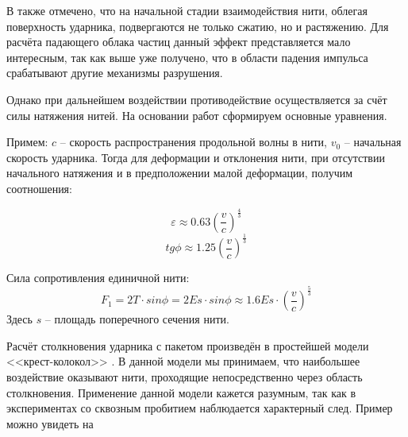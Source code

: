 В\cite{kobylkin2014} также отмечено, что на начальной стадии взаимодействия нити, облегая поверхность ударника, подвергаются
не только сжатию, но и растяжению.
Для расчёта падающего облака частиц данный эффект представляется мало интересным, так как выше уже получено, что в области
падения импульса срабатывают другие механизмы разрушения.

Однако при дальнейшем воздействии противодействие осуществляется за счёт силы натяжения нитей.
На основании работ\cite{rakhmatulin} сформируем основные уравнения.

Примем: $c$ -- скорость распространения продольной волны в нити, $v_0$ -- начальная скорость ударника.
Тогда для деформации и отклонения нити, при отсутствии начального натяжения и в предположении малой деформации,
получим соотношения:

\begin{equation}
    \varepsilon \approx 0.63 \left( \dfrac{v}{c} \right)^{\frac{4}{3}}
\end{equation}
\begin{equation}
    tg \phi \approx 1.25 \left( \dfrac{v}{c} \right)^{\frac{1}{3}}
\end{equation}

Сила сопротивления единичной нити:
\begin{equation}
    F_1 = 2 T \cdot sin \phi = 2 E s \cdot sin \phi \approx 1.6 E s \cdot \left( \dfrac{v}{c} \right)^{\frac{5}{3}}
\end{equation}
Здесь $s$ -- площадь поперечного сечения нити.

Расчёт столкновения ударника с пакетом произведён в простейшей модели <<крест-колокол>>\cite{kharchenko} .
В данной модели мы принимаем, что наибольшее воздействие оказывают нити, проходящие непосредственно через область столкновения.
Применение данной модели кажется разумным, так как в экспериментах со сквозным пробитием наблюдается характерный след.
Пример можно увидеть на 

